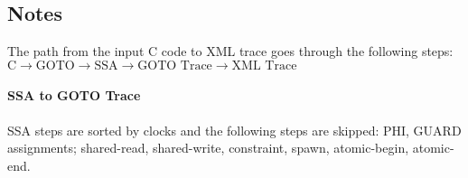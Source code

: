\documentclass[12pt]{article}
\begin{document}
\subsection{Notes}

The path from the input C code to XML trace goes through the following steps:\\

$\textrm{C} \to \textrm{GOTO} \to \textrm{SSA} \to \textrm{GOTO Trace} \to \textrm{XML Trace}$

\paragraph{SSA to GOTO Trace}

SSA steps are sorted by clocks and the following steps are skipped: PHI, GUARD
assignments; shared-read, shared-write, constraint, spawn, atomic-begin,
atomic-end.
\end{document}
